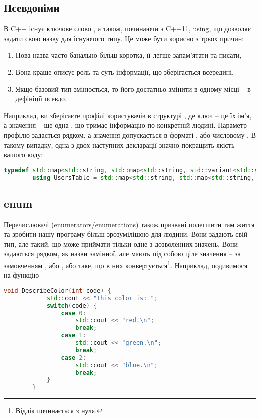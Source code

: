 \documentclass[12pt]{article}
\begin{document}
	\subsection{Псевдоніми}
	В C++ існує ключове слово \href{https://en.cppreference.com/w/cpp/language/typedef}{}, а також, починаючи з C++11, \href{https://en.cppreference.com/w/cpp/language/type_alias}{using}, що дозволяє задати свою назву для існуючого типу. Це може бути корисно з трьох причин:
	\begin{enumerate}
		\item Нова назва часто банально більш коротка, її легше запам'ятати та писати,
		\item Вона краще описує роль та суть інформації, що зберігається всередині,
		\item Якщо базовий тип змінюється, то його достатньо змінити в одному місці -- в дефініції псевдо.
	\end{enumerate}

	Наприклад, ви зберігаєте профілі користувачів в структурі , де ключ -- це їх ім'я, а значення -- ще одна , що тримає інформацію по конкретній людині. Параметр профілю задається рядком, а значення допускається в форматі , або числовому . В такому випадку, одна з двох наступних декларації значно покращить якість вашого коду:
	\begin{lstlisting}[language=c++]
		typedef std::map<std::string, std::map<std::string, std::variant<std::string, int>>> UsersTable;
		using UsersTable = std::map<std::string, std::map<std::string, std::variant<std::string, int>>>;
	\end{lstlisting}

	\subsection{enum}
	\href{https://en.cppreference.com/w/cpp/language/enum}{Перечислювачі (enumerators/enumerations)} також призвані полегшити там життя та зробити нашу програму більш зрозумілішою для людини. Вони задають свій тип, але такий, що може приймати тільки одне з дозволенних значень. Вони задаються рядком, як назви замінної, але мають під собою ціле значення -- за замовченням , або , або таке, що в них конвертується\footnote{Відлік починається з нуля.}. Наприклад, подивимося на функцію
	\begin{lstlisting}[language=c++]
		void DescribeColor(int code) {
			std::cout << "This color is: ";
			switch(code) {
				case 0:
					std::cout << "red.\n";
					break;
				case 1:
					std::cout << "green.\n";
					break;
				case 2:
					std::cout << "blue.\n";
					break;
			}
		}
	\end{lstlisting}
\end{document}
